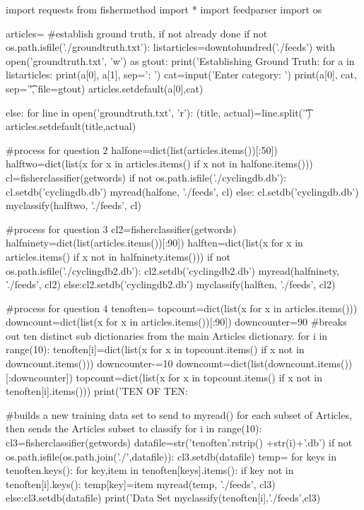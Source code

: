 \documentclass[12pt, letterpaper]{article}
\begin{document}
\begin{MyPython}[caption= Feed Classify, label=lst:feedclassify]
import requests
from fishermethod import *
import feedparser
import os

articles={}
#establish ground truth, if not already done
if not os.path.isfile('./groundtruth.txt'):
    listarticles=downtohundred('./feeds')
    with open('groundtruth.txt', 'w') as gtout:
        print('Establishing Ground Truth: %
        for a in listarticles:
            print(a[0], a[1], sep=': ')
            cat=input('Enter category: ')
            print(a[0], cat, sep='\t', file=gtout)
            articles.setdefault(a[0],cat)

else:
    for line in open('groundtruth.txt', 'r'):
        (title, actual)=line.split('\t')
        articles.setdefault(title,actual)
        
#process for question 2
halfone=dict(list(articles.items())[:50])
halftwo=dict(list(x for x in articles.items() if x not in halfone.items()))
cl=fisherclassifier(getwords)
if not os.path.isfile('./cyclingdb.db'):
    cl.setdb('cyclingdb.db')
    myread(halfone, './feeds', cl)
else: cl.setdb('cyclingdb.db')
myclassify(halftwo, './feeds', cl)

#process for question 3
cl2=fisherclassifier(getwords)
halfninety=dict(list(articles.items())[:90])
halften=dict(list(x for x in articles.items() if x not in halfninety.items()))
if not os.path.isfile('./cyclingdb2.db'):
    cl2.setdb('cyclingdb2.db')
    myread(halfninety, './feeds', cl2)
else:cl2.setdb('cyclingdb2.db')
myclassify(halften, './feeds', cl2)

#process for question 4
tenoften={}
topcount=dict(list(x for x in articles.items()))
downcount=dict(list(x for x in articles.items())[:90])
downcounter=90
#breaks out ten distinct sub dictionaries from the main Articles dictionary.
for i in range(10):
    tenoften[i]=dict(list(x for x in topcount.items() if x not in downcount.items()))
    downcounter-=10
    downcount=dict(list(downcount.items())[:downcounter])
    topcount=dict(list(x for x in topcount.items() if x not in tenoften[i].items()))
print('TEN OF TEN: %

#builds a new training data set to send to myread() for each subset of Articles, then sends the Articles subset to classify
for i in range(10):
    cl3=fisherclassifier(getwords)
    datafile=str('tenoften'.rstrip() +str(i)+'.db')
    if not os.path.isfile(os.path.join('./',datafile)):
        cl3.setdb(datafile)
        temp={}
        for keys in tenoften.keys():
            for key,item in tenoften[keys].items():
                if key not in tenoften[i].keys():
                    temp[key]=item                  
        myread(temp, './feeds', cl3)
    else:cl3.setdb(datafile)
    print('Data Set %
    myclassify(tenoften[i],'./feeds',cl3)
\end{MyPython}
\end{document}
